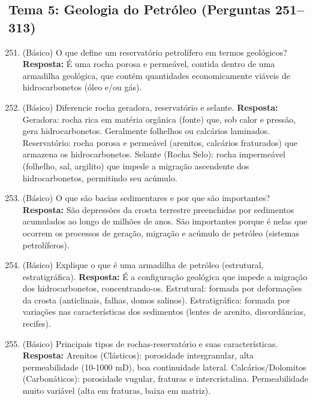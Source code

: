 \documentclass[11pt,a4paper]{article}
\begin{document}
\newpage

\subsection*{Tema 5: Geologia do Petróleo (Perguntas 251–313)}

\begin{enumerate}
  \setcounter{enumi}{250}
  \item (Básico) O que define um reservatório petrolífero em termos geológicos?
  \textbf{Resposta:} É uma rocha porosa e permeável, contida dentro de uma armadilha geológica, que contém quantidades economicamente viáveis de hidrocarbonetos (óleo e/ou gás).

  \item (Básico) Diferencie rocha geradora, reservatório e selante.
  \textbf{Resposta:} Geradora: rocha rica em matéria orgânica (fonte) que, sob calor e pressão, gera hidrocarbonetos. Geralmente folhelhos ou calcários laminados. Reservatório: rocha porosa e permeável (arenitos, calcários fraturados) que armazena os hidrocarbonetos. Selante (Rocha Selo): rocha impermeável (folhelho, sal, argilito) que impede a migração ascendente dos hidrocarbonetos, permitindo seu acúmulo.

  \item (Básico) O que são bacias sedimentares e por que são importantes?
  \textbf{Resposta:} São depressões da crosta terrestre preenchidas por sedimentos acumulados ao longo de milhões de anos. São importantes porque é nelas que ocorrem os processos de geração, migração e acúmulo de petróleo (sistemas petrolíferos).

  \item (Básico) Explique o que é uma armadilha de petróleo (estrutural, estratigráfica).
  \textbf{Resposta:} É a configuração geológica que impede a migração dos hidrocarbonetos, concentrando-os. Estrutural: formada por deformações da crosta (anticlinais, falhas, domos salinos). Estratigráfica: formada por variações nas características dos sedimentos (lentes de arenito, discordâncias, recifes).

  \item (Básico) Principais tipos de rochas-reservatório e suas características.
  \textbf{Resposta:} Arenitos (Clásticos): porosidade intergranular, alta permeabilidade (10-1000 mD), boa continuidade lateral. Calcários/Dolomitos (Carbonáticos): porosidade vugular, fraturas e intercristalina. Permeabilidade muito variável (alta em fraturas, baixa em matriz).


\end{enumerate}
\end{document}
